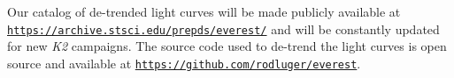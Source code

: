 \documentclass[]{emulateapj}
\newcommand{\note}[1]{{\color{red} #1}}
\begin{document}
Our catalog of de-trended light curves will be made publicly available at
\texttt{\note{\url{https://archive.stsci.edu/prepds/everest/}}} and will be constantly
updated for new \emph{K2} campaigns. The source code used to de-trend the light curves
is open source and available at \texttt{\url{https://github.com/rodluger/everest}}.



\end{document}
